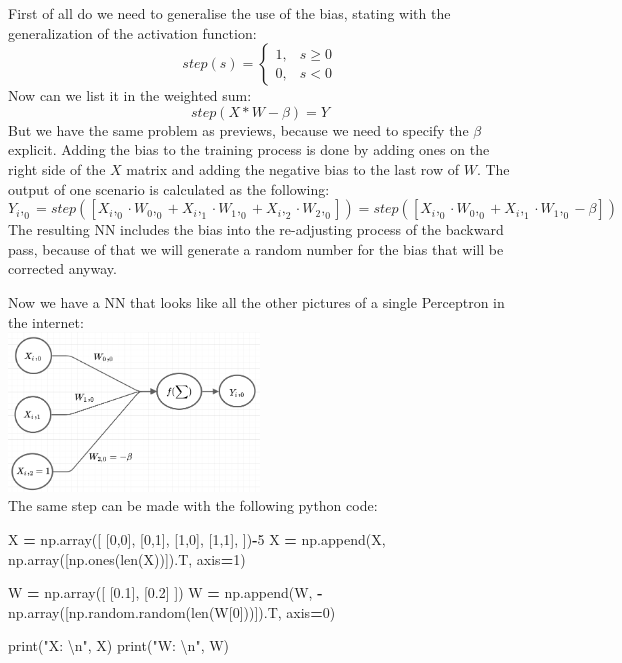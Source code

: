 \documentclass[
]{book}
\newenvironment{Shaded}{\begin{snugshade}}{\end{snugshade}}
\newcommand{\BuiltInTok}[1]{#1}
\newcommand{\CharTok}[1]{\textcolor[rgb]{0.31,0.60,0.02}{#1}}
\newcommand{\DecValTok}[1]{\textcolor[rgb]{0.00,0.00,0.81}{#1}}
\newcommand{\FloatTok}[1]{\textcolor[rgb]{0.00,0.00,0.81}{#1}}
\newcommand{\NormalTok}[1]{#1}
\newcommand{\OperatorTok}[1]{\textcolor[rgb]{0.81,0.36,0.00}{\textbf{#1}}}
\newcommand{\StringTok}[1]{\textcolor[rgb]{0.31,0.60,0.02}{#1}}
\begin{document}
First of all do we need to generalise the use of the bias, stating with the generalization of the activation function:
\[ 
step(s)= 
\begin{cases}
    1,& s   \geq 0\\
    0,& s < 0
\end{cases}
\]
Now can we list it in the weighted sum:
\[
  step(X * W - \beta) = Y
\]
But we have the same problem as previews, because we need to specify the \(\beta\) explicit. Adding the bias to the training process is done by adding ones on the right side of the \(X\) matrix and adding the negative bias to the last row of \(W\). The output of one scenario is calculated as the following:
\[
  Y_i,_0 = step([X_i,_0 \cdot W_0,_0 + X_i,_1 \cdot W_1,_0 + X_i,_2 \cdot W_2,_0]) = step([X_i,_0 \cdot W_0,_0 + X_i,_1 \cdot W_1,_0 - \beta])
\]
The resulting NN includes the bias into the re-adjusting process of the backward pass, because of that we will generate a random number for the bias that will be corrected anyway.

Now we have a NN that looks like all the other pictures of a single Perceptron in the internet:\\
\includegraphics[width=0.5\textwidth,height=\textheight]{./img/NN_02.png}\\
The same step can be made with the following python code:

\begin{Shaded}
\begin{Highlighting}[]
\NormalTok{X }\OperatorTok{=}\NormalTok{ np.array([}
\NormalTok{  [}\DecValTok{0}\NormalTok{,}\DecValTok{0}\NormalTok{],}
\NormalTok{  [}\DecValTok{0}\NormalTok{,}\DecValTok{1}\NormalTok{],}
\NormalTok{  [}\DecValTok{1}\NormalTok{,}\DecValTok{0}\NormalTok{],}
\NormalTok{  [}\DecValTok{1}\NormalTok{,}\DecValTok{1}\NormalTok{],}
\NormalTok{])}\OperatorTok{{-}}\DecValTok{5}
\NormalTok{X }\OperatorTok{=}\NormalTok{ np.append(X, np.array([np.ones(}\BuiltInTok{len}\NormalTok{(X))]).T, axis}\OperatorTok{=}\DecValTok{1}\NormalTok{)}

\NormalTok{W }\OperatorTok{=}\NormalTok{ np.array([}
\NormalTok{  [}\FloatTok{0.1}\NormalTok{], }
\NormalTok{  [}\FloatTok{0.2}\NormalTok{]}
\NormalTok{])}
\NormalTok{W }\OperatorTok{=}\NormalTok{ np.append(W, }\OperatorTok{{-}}\NormalTok{np.array([np.random.random(}\BuiltInTok{len}\NormalTok{(W[}\DecValTok{0}\NormalTok{]))]).T, axis}\OperatorTok{=}\DecValTok{0}\NormalTok{)}

\BuiltInTok{print}\NormalTok{(}\StringTok{"X: }\CharTok{\textbackslash{}n}\StringTok{"}\NormalTok{, X)}
\BuiltInTok{print}\NormalTok{(}\StringTok{"W: }\CharTok{\textbackslash{}n}\StringTok{"}\NormalTok{, W)}
\end{Highlighting}
\end{Shaded}
\end{document}
